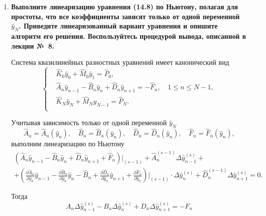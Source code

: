 \documentclass[a4paper,oneside,12pt]{extreport}
\begin{document}
\begin{enumerate}
	\item
	\textbf{
		Выполните линеаризацию уравнения (14.8) по Ньютону, полагая для простоты, что все коэффициенты зависят только от одной переменной $\widehat y_N$.
		Приведите линеаризованный вариант уравнения и опишите алгоритм его решения.
		Воспользуйтесь процедурой вывода, описанной в лекции №~8.
	}

	Система квазилинейных разностных уравнений имеет канонический вид
	\begin{equation*}
		\left\{
		\begin{aligned}
			&\widehat K_0\widehat y_0 + \widehat M_0\widehat y_1 = \widehat P_0,\\
			&\widehat A_n\widehat y_{n-1} - \widehat B_n\widehat y_n + \widehat D_n\widehat y_{n+1}=-\widehat F_n, \quad 1\leqslant n\leqslant N-1,\\
			&\widehat K_N\widehat y_N + \widehat M_N\widehat y_{N-1} = \widehat P_N.\\
		\end{aligned}
		\right.
	\end{equation*}

	Учитывая зависимость только от одной переменной $\widehat y_N$
	\begin{equation*}
		\widehat A_n=\widehat A_n(\widehat y_n),\quad
		\widehat B_n=\widehat B_n(\widehat y_n),\quad
		\widehat D_n=\widehat D_n(\widehat y_n),\quad
		\widehat F_n=\widehat F_n(\widehat y_n),
	\end{equation*}
	выполним линеаризацию по Ньютону
	\begin{multline*}
		\left(\widehat A_n\widehat y_{n-1} - \widehat B_n\widehat y_n + \widehat D_n\widehat y_{n+1} + \widehat F_n\right)\bigg|_{(s-1)}
		+\widehat A_n^{(s-1)}\Delta\widehat y_{n-1}^{(s)}
		+\\+\left(\frac{\partial\widehat A_n}{\partial\widehat y_n}\widehat y_{n-1}-\frac{\partial\widehat B_n}{\partial\widehat y_n}\widehat y_n-\widehat B_n+\frac{\partial\widehat D_n}{\partial\widehat y_n}\widehat y_{n+1}+\frac{\partial\widehat F_n}{\partial\widehat y_n}\right)\bigg|_{(s-1)}
		\cdot\Delta\widehat y_n^{(s)}+\widehat D_n^{(s-1)}\Delta\widehat y_{n+1}^{(s)}
		=0.
	\end{multline*}

	Тогда
	\begin{equation*}
		A_n\Delta\widehat y_{n-1}^{(s)} - B_n\Delta\widehat y_{n}^{(s)} + D_n\Delta\widehat y_{n+1}^{(s)} = -F_n
	\end{equation*}


\end{enumerate}
\end{document}
